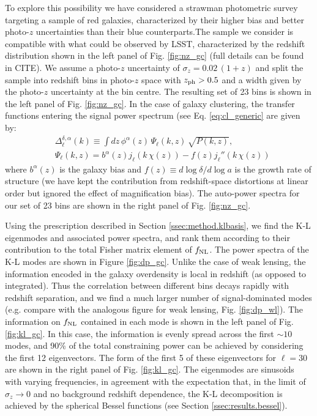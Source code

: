 \documentclass[twocolumn,amsfont,amssymb,amsmath, showpacs,balancelastpage, nofootinbib]{revtex4-1}
\begin{document}
    To explore this possibility we have considered a strawman photometric survey targeting a sample of red galaxies, characterized by their higher bias and better photo-$z$ uncertainties than their blue counterparts.The sample we consider is compatible with what could be observed by LSST, characterized by the redshift distribution shown in the left panel of Fig. \ref{fig:nz_gc} (full details can be found in CITE). We assume a photo-$z$ uncertainty of $\sigma_z=0.02\,(1+z)$ and split the sample into redshift bins in photo-$z$ space with $z_{\rm ph}>0.5$ and a width given by the photo-$z$ uncertainty at the bin centre. The resulting set of 23 bins is shown in the left panel of Fig. \ref{fig:nz_gc}. In the case of galaxy clustering, the transfer functions entering the signal power spectrum (see Eq. \ref{eq:cl_generic} are given by:
    \begin{align}\nonumber
      &\Delta^{\delta,\alpha}_\ell(k)\equiv\int dz\,\phi^\alpha(z)\,\Psi_\ell(k,z)\,\sqrt{P(k,z)},\\\label{eq:tgc_dr}
      &\Psi_\ell(k,z)=b^\alpha(z)j_\ell(k\,\chi(z))-f(z)j_\ell''(k\,\chi(z))
    \end{align}
    where $b^\alpha(z)$ is the galaxy bias and $f(z)\equiv d\log\delta/d\log a$ is the growth rate of structure (we have kept the contribution from redshift-space distortions at linear order but ignored the effect of magnification bias). The auto-power spectra for our set of 23 bins are shown in the right panel of Fig. \ref{fig:nz_gc}.
    
    Using the prescription described in Section \ref{ssec:method.klbasis}, we find the K-L eigenmodes and associated power spectra, and rank them according to their contribution to the total Fisher matrix element of $f_{\rm NL}$. The power spectra of the K-L modes are shown in Figure \ref{fig:dp_gc}. Unlike the case of weak lensing, the information encoded in the galaxy overdensity is local in redshift (as opposed to integrated). Thus the correlation between different bins decays rapidly with redshift separation, and we find a much larger number of signal-dominated modes (e.g. compare with the analogous figure for weak lensing, Fig. \ref{fig:dp_wl}). The information on $f_{\rm NL}$ contained in each mode is shown in the left panel of Fig. \ref{fig:kl_gc}. In this case, the information is evenly spread across the first $\sim10$ modes, and 90\% of the total constraining power can be achieved by considering the first 12 eigenvectors. The form of the first 5 of these eigenvectors for $\ell=30$ are shown in the right panel of Fig. \ref{fig:kl_gc}. The eigenmodes are sinusoids with varying frequencies, in agreement with the expectation that, in the limit of $\sigma_z\rightarrow0$ and no background redshift dependence, the K-L decomposition is achieved by the spherical Bessel functions (see Section \ref{ssec:results.bessel}).
    
\end{document}
